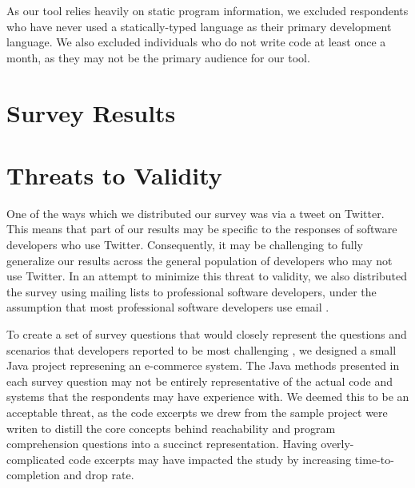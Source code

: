 \par As our tool relies heavily on static program information, we excluded
respondents who have never used a statically-typed language as their primary
development language. 
We also excluded individuals who do not write code at least once a month,
as they may not be the primary audience for our tool.

\section{Survey Results}
\label{sec:SurveyResults}


\section{Threats to Validity}
\label{sec:ThreatsToValidity}


\noindent One of the ways which we distributed our survey was via a tweet on 
Twitter.
This means that part of our results may be specific to the responses of
software developers who use Twitter.
Consequently, it may be challenging to fully generalize our results across
the general population of developers who may not use Twitter.
In an attempt to minimize this threat to validity, we also distributed the 
survey using mailing lists to professional software developers, under the
assumption that most professional software developers use email
\cite{gousios-2016-work-practices}.


\par To create a set of survey questions that would closely represent the
questions and scenarios that developers reported to be most challenging
\cite{latoza-2010-hard-questions, latoza-2010-reach}, we designed a small Java
project represening an e-commerce system.
The Java methods presented in each survey question may not be entirely
representative of the actual code and systems that the respondents may have
experience with.
We deemed this to be an acceptable threat, as the code excerpts we drew from
the sample project were writen to distill the core concepts behind
reachability and program comprehension questions into a succinct representation.
Having overly-complicated code excerpts may have impacted the study by
increasing time-to-completion and drop rate.

